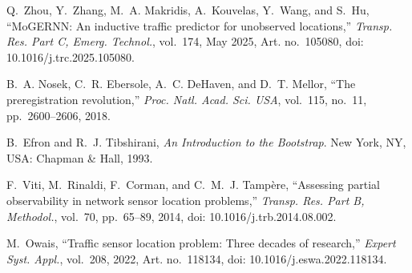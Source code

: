 Q.~Zhou, Y.~Zhang, M.~A. Makridis, A.~Kouvelas, Y.~Wang, and S.~Hu, ``MoGERNN: An inductive traffic predictor for unobserved locations,'' \emph{Transp. Res. Part C, Emerg. Technol.}, vol.~174, May 2025, Art. no.~105080, doi: 10.1016/j.trc.2025.105080.

B.~A. Nosek, C.~R. Ebersole, A.~C. DeHaven, and D.~T. Mellor, ``The preregistration revolution,'' \emph{Proc. Natl. Acad. Sci. USA}, vol.~115, no.~11, pp.~2600--2606, 2018.

B.~Efron and R.~J. Tibshirani, \emph{An Introduction to the Bootstrap}. New York, NY, USA: Chapman \& Hall, 1993.

F.~Viti, M.~Rinaldi, F.~Corman, and C.~M.~J. Tamp\`ere, ``Assessing partial observability in network sensor location problems,'' \emph{Transp. Res. Part B, Methodol.}, vol.~70, pp.~65--89, 2014, doi: 10.1016/j.trb.2014.08.002.

M.~Owais, ``Traffic sensor location problem: Three decades of research,'' \emph{Expert Syst. Appl.}, vol.~208, 2022, Art. no.~118134, doi: 10.1016/j.eswa.2022.118134.
